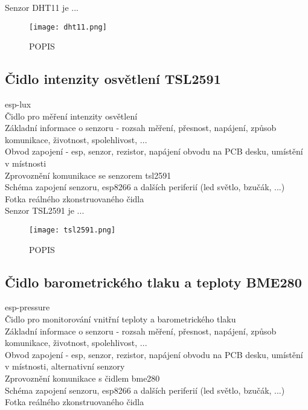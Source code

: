 Senzor DHT11 je ...

\begin{figure}[H]
  \centering
  \texttt{[image: dht11.png]}
  \caption{POPIS}
  \label{fig:hardware_components:LABEL}
\end{figure}

\subsection{Čidlo intenzity osvětlení TSL2591}

esp-lux \\
Čidlo pro měření intenzity osvětlení \\
Základní informace o senzoru - rozsah měření, přesnost, napájení, způsob komunikace, životnost, spolehlivost, ... \\
Obvod zapojení - esp, senzor, rezistor, napájení obvodu na PCB desku, umístění v místnosti \\
Zprovoznění komunikace se senzorem tsl2591 \\
Schéma zapojení senzoru, esp8266 a dalších periferií (led světlo, bzučák, ...) \\
Fotka reálného zkonstruovaného čidla \\

Senzor TSL2591 je ...

\begin{figure}[H]
  \centering
  \texttt{[image: tsl2591.png]}
  \caption{POPIS}
  \label{fig:hardware_components:LABEL}
\end{figure}

\subsection{Čidlo barometrického tlaku a teploty BME280}

esp-pressure \\
Čidlo pro monitorování vnitřní teploty a barometrického tlaku \\
Základní informace o senzoru - rozsah měření, přesnost, napájení, způsob komunikace, životnost, spolehlivost, ... \\
Obvod zapojení - esp, senzor, rezistor, napájení obvodu na PCB desku, umístění v místnosti, alternativní senzory \\
Zprovoznění komunikace s čidlem bme280 \\
Schéma zapojení senzoru, esp8266 a dalších periferií (led světlo, bzučák, ...) \\
Fotka reálného zkonstruovaného čidla \\

